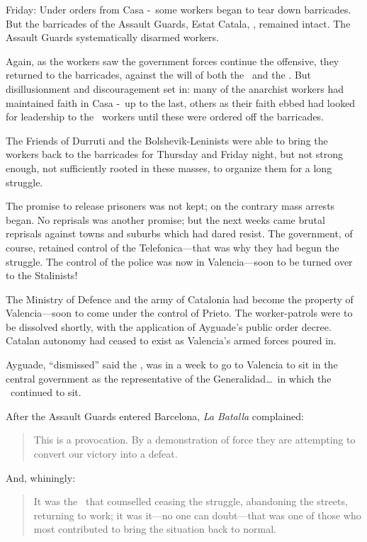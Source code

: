 Friday: Under orders from Casa \CNT-\FAI\ some workers began to tear down barricades. But the barricades of the Assault Guards, Estat Catala, \PSUC, remained intact. The Assault Guards systematically disarmed workers.

Again, as the workers saw the government forces continue the offensive, they returned to the barricades, against the will of both the \CNT\ and the \POUM. But disillusionment and discouragement set in: many of the anarchist workers had maintained faith in Casa \CNT-\FAI\ up to the last, others as their faith ebbed had looked for leadership to the \POUM\ workers until these were ordered off the barricades.

The Friends of Durruti and the Bolshevik-Leninists were able to bring the workers back to the barricades for Thursday and Friday night, but not strong enough, not sufficiently rooted in these masses, to organize them for a long struggle.

The promise to release prisoners was not kept; on the contrary mass arrests began. No reprisals was another promise; but the next weeks came brutal reprisals against towns and suburbs which had dared resist. The government, of course, retained control of the Telefonica---that was why they had begun the struggle. The control of the police was now in Valencia---soon to be turned over to the Stalinists!

The Ministry of Defence and the army of Catalonia had become the property of Valencia---soon to come under the control of Prieto. The worker-patrols were to be dissolved shortly, with the application of Ayguade’s public order decree. Catalan autonomy had ceased to exist as Valencia’s armed forces poured in.

Ayguade, ``dismissed'' said the \CNT, was in a week to go to Valencia to sit in the central government as the representative of the Generalidad\dots\ in which the \CNT\ continued to sit.

After the Assault Guards entered Barcelona, \emph{La Batalla} complained:

\begin{quotation}
  This is a provocation. By a demonstration of force they are attempting to convert our victory into a defeat.
\end{quotation}

And, whiningly:

\begin{quotation}
  It was the \POUM\ that counselled ceasing the struggle, abandoning the streets, returning to work; it was it---no one can doubt---that was one of those who most contributed to bring the situation back to normal.
\end{quotation}

